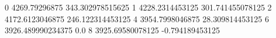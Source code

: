 0 4269.79296875 343.302978515625
1 4228.2314453125 301.741455078125
2 4172.6123046875 246.122314453125
4 3954.7998046875 28.309814453125
6 3926.489990234375 0.0
8 3925.69580078125 -0.794189453125
